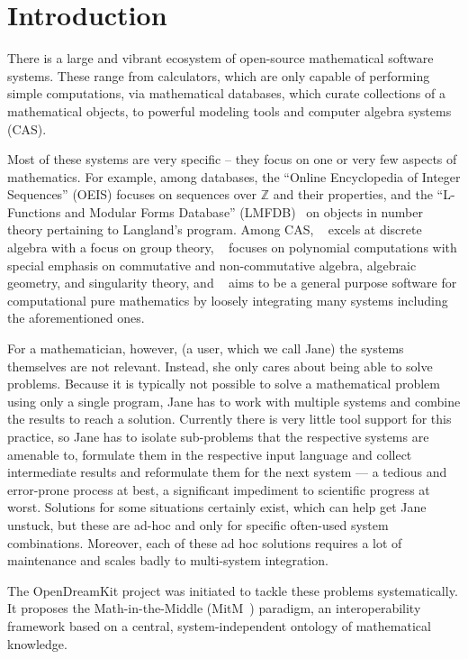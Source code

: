 \section{Introduction}\label{sec:intro}

There is a large and vibrant ecosystem of open-source mathematical software systems. 
These range from calculators, which are only capable of performing simple computations, via mathematical databases, which curate collections of a mathematical objects, to powerful modeling tools and computer algebra systems (CAS).

Most of these systems are very specific -- they focus on one or very few aspects of
mathematics.  For example, among databases, the ``Online Encyclopedia of Integer Sequences'' (OEIS) focuses
on sequences over $\mathbb{Z}$ and their properties, and the ``L-Functions and Modular Forms
Database'' (LMFDB)~\cite{Cremona:LMFDB16,lmfdb:on} on objects in number theory pertaining to
Langland's program. Among CAS, \GAP~\cite{GAP:on} excels at discrete algebra with a focus on group theory,
\Singular~\cite{singular:on} focuses on polynomial computations with special emphasis on
commutative and non-commutative algebra, algebraic geometry, and singularity theory, and
\Sage~\cite{SageMath:on} aims to be a general purpose software for computational pure
mathematics by loosely integrating many systems including the aforementioned ones.

For a mathematician, however, (a user, which we call Jane) the systems themselves are not relevant.
Instead, she only cares about being able to solve problems. 
Because it is typically not possible to solve a mathematical problem using only a single program, Jane has to work with multiple systems and combine the results to reach a solution. 
Currently there is very little tool support for this practice, so Jane has to isolate sub-problems that the respective systems are amenable to, formulate them in the respective input language and collect intermediate results and reformulate them for the next system --- a tedious and error-prone process at best, a significant impediment to scientific progress at worst.
Solutions for some situations certainly exist, which can help get Jane unstuck, but these are ad-hoc and only for specific often-used system combinations. 
Moreover, each of these ad hoc solutions requires a lot of maintenance and scales badly to multi-system integration. 

The OpenDreamKit project was initiated to tackle these problems systematically.
It proposes the Math-in-the-Middle (MitM~\cite{DehKohKon:iop16}) paradigm, an interoperability framework based on a central, system-independent ontology of mathematical knowledge.

